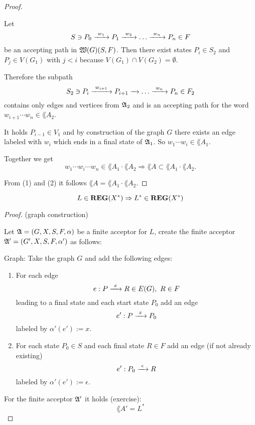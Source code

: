 \begin{proof}
\begin{enumerate}
  Let \[ S \ni P_0 \xrightarrow{\ {w_1}\ } P_1 \xrightarrow{\ {w_2}\ } \ldots \xrightarrow{\ {w_n}\ } P_n \in F \] be
  an accepting path in $\mbox{$\mathfrak{W}({G})$}(S, F)$. Then there exist states $P_i \in
  S_2$ and $P_j \in V(G_1)$ with $j < i$ because $V(G_1) \cap V(G_2) =
  \emptyset$.
  
  \missingfigure
  
  Therefore the subpath \[ S_2 \ni P_i \xrightarrow{\ {w_{i+1}}\ } P_{i+1} \xrightarrow{\ {}\ } \ldots
  \xrightarrow{\ {w_n}\ } P_n \in F_2 \] contains only edges and vertices from $\mbox{$\mathfrak{A}$}_2$ and
  is an accepting path for the word $w_{i+1} \cdots w_n \in \lang{A}_2$.
  
  It holds $P_{i-1} \in V_1$ and by construction of the graph $G$ there exists
  an edge labeled with $w_i$ which ends in a final state of $\mbox{$\mathfrak{A}$}_1$. So $w_1
  \cdots w_i \in \lang{A}_1$.
  
  Together we get \[ w_1 \cdots w_i \cdots w_n \in \lang{A}_1 \cdot
  \lang{A}_2 \Rightarrow \lang{A} \subset \lang{A}_1 \cdot \lang{A}_2.\]
\end{enumerate}

From (1) and (2) it follows $\lang{A} = \lang{A}_1 \cdot
\lang{A}_2$.
\end{proof}

\bigskip
\begin{theorem}
\[ L \in \mbox{{\bf REG}}(X^*) \Rightarrow L^* \in \mbox{{\bf REG}}(X^*) \]
\end{theorem}

\begin{proof}
\missingfigure (graph construction)

Let $\mbox{$\mathfrak{A}$} = (G, X, S, F, \alpha)$	be a finite acceptor for $L$, create the
finite acceptor $\mbox{$\mathfrak{A'}$} = (G', X, S, F, \alpha')$ as follows:

Graph: Take the graph $G$ and add the following edges: 

\begin{enumerate}
  \item For each edge \[e : P \xrightarrow{\ {x}\ } R \in E(G),\ R \in F\] leading to a
  final state and each start state $P_0$ add an edge \[e' : P \xrightarrow{\ {x}\ } P_0 \]
  labeled by $\alpha'(e') := x$.
  \item For each state $P_0 \in S$ and each final state $R \in F$ add an edge
  (if not already existing) \[ e' : P_0 \xrightarrow{\ {\epsilon}\ } R \]
  labeled by $\alpha'(e') := \epsilon$.
\end{enumerate}

For the finite acceptor $\mbox{$\mathfrak{A'}$}$ it holds (exercise): \[ \lang{A'} = L^* \]
\end{proof}

